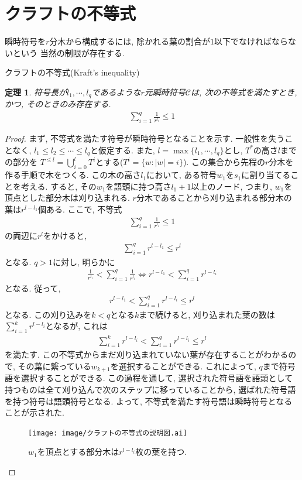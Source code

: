 \documentclass[12pt]{ltjsarticle}
\newtheorem{theorem}{定理}
\begin{document}
\section{クラフトの不等式}
瞬時符号を$r$分木から構成するには, 除かれる葉の割合が$1$以下でなければならないという
当然の制限が存在する.
\begin{itembox}[l]{クラフトの不等式(Kraft's inequality)}
  \begin{theorem}
    符号長が$l_1, \cdots, l_q$であるような$r$元瞬時符号$\mathcal{C}$は,
    次の不等式を満たすとき, かつ, そのときのみ存在する.
    \begin{align*}
      \sum_{i = 1}^q \frac{1}{r^{l_i}} \leq 1
    \end{align*}
  \end{theorem}
\end{itembox}
\begin{proof}
  まず, 不等式を満たす符号が瞬時符号となることを示す.
  一般性を失うことなく, $l_1 \leq l_2 \leq \cdots \leq l_q$と仮定する.
  また, $l = \max \{l_1, \cdots, l_q\}$とし, $T^*$の高さ$l$までの部分を
  $T^{\leq l} = \bigcup_{i = 0}^l T^i$とする($T^i = \{w : |w| = i\}$).
  この集合から先程の$r$分木を作る手順で木をつくる.
  この木の高さ$l_1$において, ある符号$w_1$を$s_1$に割り当てることを考える.
  すると, その$w_1$を語頭に持つ高さ$l_1 + 1$以上のノード, つまり,
  $w_1$を頂点とした部分木は刈り込まれる.
  $r$分木であることから刈り込まれる部分木の葉は$r^{l - l_1}$個ある.
  ここで, 不等式
  \begin{align*}
    \sum_{i = 1}^q \frac{1}{r^{l_i}} \leq 1
  \end{align*}
  の両辺に$r^l$をかけると,
  \begin{align*}
    \sum_{i = 1}^q r^{l - l_1} \leq r^l
  \end{align*}
  となる.
  $q > 1$に対し, 明らかに
  \begin{align*}
    \frac{1}{r^{l_1}} < \sum_{i = 1}^q \frac{1}{r^{l_i}} \iff r^{l - l_1} < \sum_{i = 1}^q r^{l - l_i}
  \end{align*}
  となる.
  従って,
  \begin{align*}
    r^{l - l_1} < \sum_{i = 1}^q r^{l - l_i} \leq r^l
  \end{align*}
  となる.
  この刈り込みを$k < q$となる$k$まで続けると,
  刈り込まれた葉の数は$\sum_{i = 1}^k r^{l - l_i}$となるが, これは
  \begin{align*}
    \sum_{i = 1}^k r^{l - l_i} < \sum_{i = 1}^q r^{l - l_i} \leq r^l
  \end{align*}
  を満たす.
  この不等式からまだ刈り込まれていない葉が存在することがわかるので,
  その葉に繋っている$w_{k + 1}$を選択することができる.
  これによって, $q$まで符号語を選択することができる.
  この過程を通して, 選択された符号語を語頭として持つものは全て刈り込んで次のステップに移っていることから,
  選ばれた符号語を持つ符号は語頭符号となる.
  よって, 不等式を満たす符号語は瞬時符号となることが示された.
  \begin{figure}
    \centering
    \texttt{[image: image/クラフトの不等式の説明図.ai]}
    \caption{$w_1$を頂点とする部分木は$r^{l - l_i}$枚の葉を持つ.}
  \end{figure}


\end{proof}
\end{document}
